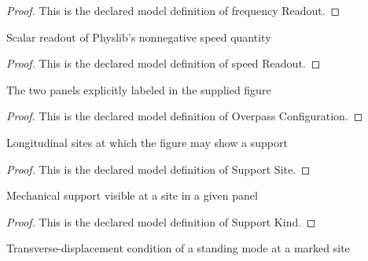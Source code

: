 \begin{proof}
  This is the declared model definition of frequency Readout.
\end{proof}
\begin{definition}
  \label{def:physics:phyx-mini-0210:phyxminiproblems-problemphyxmini0210-speedreadout}
  Scalar readout of Physlib's nonnegative speed quantity
\end{definition}
\begin{proof}
  This is the declared model definition of speed Readout.
\end{proof}
\begin{definition}
  \label{def:physics:phyx-mini-0210:phyxminiproblems-problemphyxmini0210-overpassconfiguration}
  The two panels explicitly labeled in the supplied figure
\end{definition}
\begin{proof}
  This is the declared model definition of Overpass Configuration.
\end{proof}
\begin{definition}
  \label{def:physics:phyx-mini-0210:phyxminiproblems-problemphyxmini0210-supportsite}
  Longitudinal sites at which the figure may show a support
\end{definition}
\begin{proof}
  This is the declared model definition of Support Site.
\end{proof}
\begin{definition}
  \label{def:physics:phyx-mini-0210:phyxminiproblems-problemphyxmini0210-supportkind}
  Mechanical support visible at a site in a given panel
\end{definition}
\begin{proof}
  This is the declared model definition of Support Kind.
\end{proof}
\begin{definition}
  \label{def:physics:phyx-mini-0210:phyxminiproblems-problemphyxmini0210-transverseboundarycondition}
  Transverse-displacement condition of a standing mode at a marked site
\end{definition}
